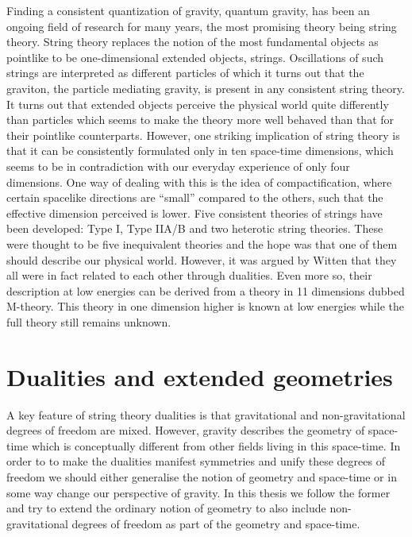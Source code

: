 Finding a consistent quantization of gravity, quantum gravity, has been an ongoing field of research for many years, the most promising theory being string theory. String theory replaces the notion of the most fundamental objects as pointlike to be one-dimensional extended objects, strings. Oscillations of such strings are interpreted as different particles of which it turns out that the graviton, the particle mediating gravity, is present in any consistent string theory. It turns out that extended objects perceive the physical world quite differently than particles which seems to make the theory more well behaved than that for their pointlike counterparts. However, one striking implication of string theory is that it can be consistently formulated only in ten space-time dimensions, which seems to be in contradiction with our everyday experience of only four dimensions. One way of dealing with this is the idea of compactification, where certain spacelike directions are ``small'' compared to the others, such that the effective dimension perceived is lower. Five consistent theories of strings have been developed: Type I, Type IIA/B and two heterotic string theories. These were thought to be five inequivalent theories and the hope was that one of them should describe our physical world. However, it was argued by Witten \cite{WittenDualities1995} that they all were in fact related to each other through dualities. Even more so, their description at low energies can be derived from a theory in 11 dimensions dubbed M-theory. This theory in one dimension higher is known at low energies while the full theory still remains unknown.

\section{Dualities and extended geometries}
A key feature of string theory dualities is that gravitational and non-gravitational degrees of freedom are mixed. However, gravity describes the geometry of space-time which is conceptually different from other fields living in this space-time. In order to to make the dualities manifest symmetries and unify these degrees of freedom we should either generalise the notion of geometry and space-time or in some way change our perspective of gravity. In this thesis we follow the former and try to extend the ordinary notion of geometry to also include non-gravitational degrees of freedom as part of the geometry and space-time. 

